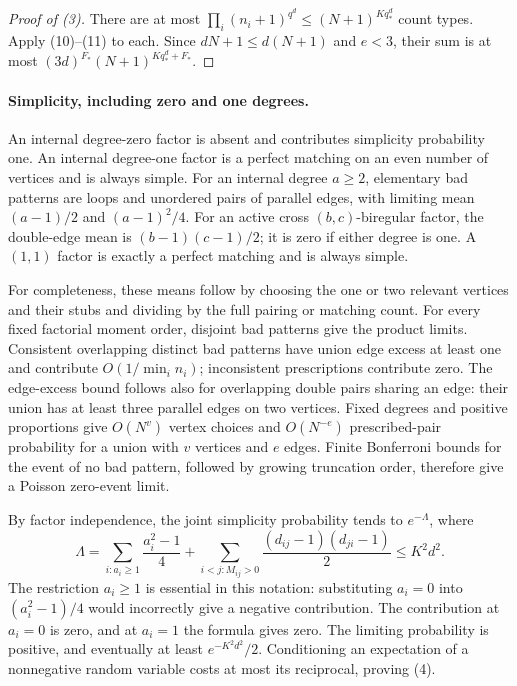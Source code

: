 \documentclass[11pt]{article}
\begin{document}
\begin{proof}[Proof of (3)]
There are at most $\prod_i(n_i+1)^{q^d}\leq(N+1)^{Kq_*^d}$ count
types. Apply (10)--(11) to each. Since $dN+1\leq d(N+1)$ and $e<3$,
their sum is at most $(3d)^{F_*}(N+1)^{Kq_*^d+F_*}$.
\end{proof}

\paragraph{Simplicity, including zero and one degrees.}
An internal degree-zero factor is absent and contributes simplicity
probability one. An internal degree-one factor is a perfect matching
on an even number of vertices and is always simple. For an internal
degree $a\geq2$, elementary bad patterns are loops and unordered pairs
of parallel edges, with limiting mean $(a-1)/2$ and $(a-1)^2/4$.
For an active cross $(b,c)$-biregular factor, the double-edge mean is
$(b-1)(c-1)/2$; it is zero if either degree is one. A $(1,1)$ factor is
exactly a perfect matching and is always simple.

For completeness, these means follow by choosing the one or two relevant
vertices and their stubs and dividing by the full pairing or matching
count. For every fixed factorial moment order, disjoint bad patterns give
the product limits. Consistent overlapping distinct bad patterns have
union edge excess at least one and contribute $O(1/\min_i n_i)$;
inconsistent prescriptions contribute zero. The edge-excess bound follows
also for overlapping double pairs sharing an edge: their union has at
least three parallel edges on two vertices. Fixed degrees and positive
proportions give $O(N^v)$ vertex choices and $O(N^{-e})$ prescribed-pair
probability for a union with $v$ vertices and $e$ edges. Finite Bonferroni
bounds for the event of no bad pattern, followed by growing truncation
order, therefore give a Poisson zero-event limit.

By factor independence, the joint simplicity probability tends to
$e^{-\Lambda}$, where
\[
 \Lambda=
 \sum_{i:a_i\geq1}\frac{a_i^2-1}{4}
 +\sum_{i<j:M_{ij}>0}\frac{(d_{ij}-1)(d_{ji}-1)}2
 \leq K^2d^2.                                    \tag{14}
\]
The restriction $a_i\geq1$ is essential in this notation: substituting
$a_i=0$ into $(a_i^2-1)/4$ would incorrectly give a negative contribution.
The contribution at $a_i=0$ is zero, and at $a_i=1$ the formula gives zero.
The limiting probability is positive, and eventually at least
$e^{-K^2d^2}/2$. Conditioning an expectation of a nonnegative random
variable costs at most its reciprocal, proving (4).
\end{document}
